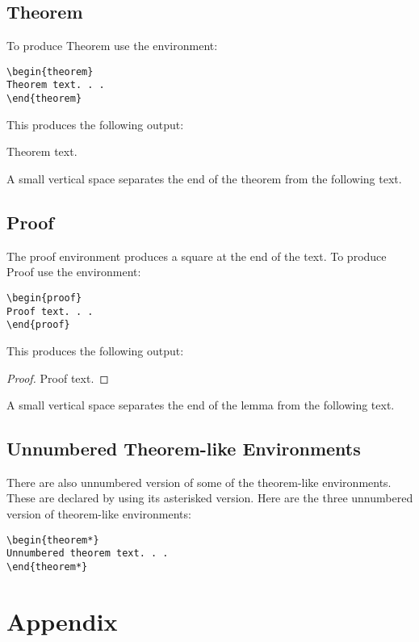 \documentclass{clv3}
\begin{document}
\subsection{Theorem}

To produce Theorem use the environment:

\begin{verbatim}
\begin{theorem}
Theorem text. . .
\end{theorem}
\end{verbatim}

This produces the following output:
\begin{theorem}\label{thm}
Theorem text.
\end{theorem}
\noindent
A small vertical space separates the end of the theorem
from the following text.

\subsection{Proof}

The proof environment produces a square at the end of the text. To produce Proof 
use the environment:

\begin{verbatim}
\begin{proof}
Proof text. . .
\end{proof}
\end{verbatim}

This produces the following output:
\begin{proof}\label{proof}
Proof text.
\end{proof}
A small vertical space separates the end of the lemma
from the following text.

\subsection{Unnumbered Theorem-like Environments}

There are also unnumbered version of some of the theorem-like environments. 
These are declared by using its asterisked version. Here are the three 
unnumbered version of theorem-like environments:

\begin{verbatim}
\begin{theorem*}
Unnumbered theorem text. . .
\end{theorem*}
\end{verbatim}

\section{Appendix}
\end{document}
